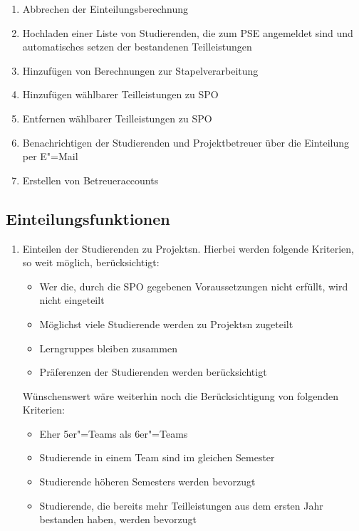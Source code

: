 \documentclass[parskip=full]{scrartcl}
\newcommand{\swtLabel}[1]{\textbf{/#1\arabic*0/}}
\begin{document}
\begin{enumerate}[label=\swtLabel{FA}, resume]
  \item Abbrechen der Einteilungsberechnung \label{FAabbruch}
  \item Hochladen einer Liste von Studierenden, die zum \gls{PSE} angemeldet sind
	    und automatisches setzen der bestandenen Teilleistungen \label{FAimport2}
  \item Hinzufügen von Berechnungen zur Stapelverarbeitung \label{FAadminStapel}
  \item Hinzufügen wählbarer Teilleistungen zu SPO \label{FAadminSPOhinzufügen}
  \item Entfernen wählbarer Teilleistungen zu SPO \label{FAadminSPOentfernen}
  \item Benachrichtigen der Studierenden und Projektbetreuer über die Einteilung
  per E"=Mail \label{FAadminBenachrichtigen}
  \item Erstellen von Betreueraccounts \label{FAadminCreateAccounts}
\end{enumerate}

\subsection{Einteilungsfunktionen}

\begin{enumerate}[label=\swtLabel{FA}, resume]
  \item Einteilen der Studierenden zu \glspl{Projekt}n. Hierbei werden folgende
  Kriterien, so weit möglich, berücksichtigt:
  \begin{itemize}
    \item Wer die, durch die \gls{SPO} gegebenen Voraussetzungen nicht erfüllt,
    wird nicht eingeteilt \label{FAeinteilung}
    \item Möglichst viele Studierende werden zu \glspl{Projekt}n zugeteilt 
    \item \glspl{Lerngruppe} bleiben zusammen
    \item Präferenzen der Studierenden werden berücksichtigt
  \end{itemize}
 Wünschenswert wäre weiterhin noch die Berücksichtigung von folgenden Kriterien:  
 \begin{itemize}
   \item Eher 5er"=Teams als 6er"=Teams
   \item Studierende in einem Team sind im gleichen Semester
   \item Studierende höheren Semesters werden bevorzugt
   \item Studierende, die bereits mehr Teilleistungen aus dem ersten Jahr
bestanden haben, werden bevorzugt 
 \end{itemize}
\end{enumerate}
\end{document}
